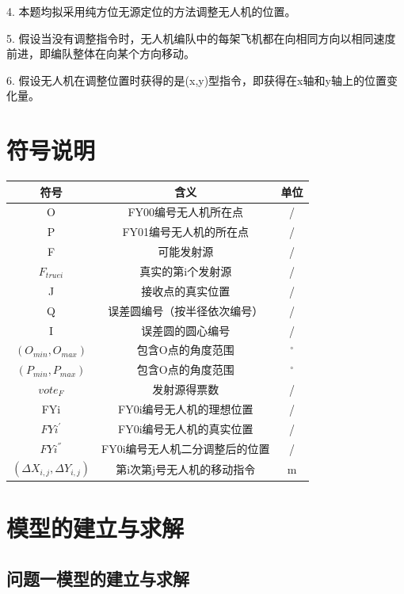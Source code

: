 \documentclass{ctexart}
\begin{document}
4. \quad 本题均拟采用纯方位无源定位的方法调整无人机的位置。

5. \quad 假设当没有调整指令时，无人机编队中的每架飞机都在向相同方向以相同速度前进，即编队整体在向某个方向移动。

6. \quad 假设无人机在调整位置时获得的是(x,y)型指令，即获得在x轴和y轴上的位置变化量。

\section{符号说明}

\begin{table}[H]
  \centering
  \begin{tabular}{ccc}
  \toprule
  符号& 含义& 单位\\
  \midrule
  O&FY00编号无人机所在点&/\\
  P&FY01编号无人机的所在点&/\\
  F&可能发射源&/\\
  $F_{truei}$&真实的第i个发射源&/\\
  J&接收点的真实位置&/\\
  Q&误差圆编号（按半径依次编号）&/\\
  I&误差圆的圆心编号&/\\
  $(O_{min},O_{max})$&包含O点的角度范围&$^{\circ}$\\
  $(P_{min},P_{max})$&包含O点的角度范围&$^{\circ}$\\
  $vote_F$&发射源得票数&/\\
  FYi&FY0i编号无人机的理想位置&/\\
  $FYi^{'}$&FY0i编号无人机的真实位置&/\\
  $FYi^{''}$&FY0i编号无人机二分调整后的位置&/\\
  $(\Delta X_{i,j},\Delta Y_{i,j})$&第i次第j号无人机的移动指令&m\\
  \bottomrule
  \end{tabular}
  \end{table}




\section{模型的建立与求解}

\subsection{问题一模型的建立与求解}
\end{document}
